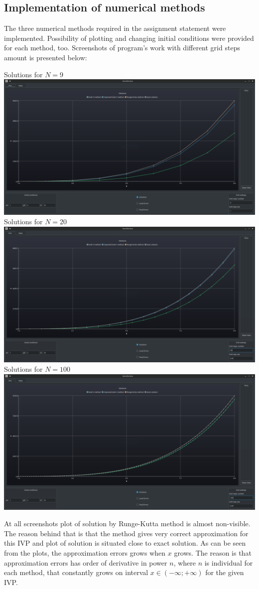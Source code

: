 \documentclass[a4paper,12pt]{article}
\begin{document}
\subsection{Implementation of numerical methods}
The three numerical methods required in the assignment statement were
implemented. Possibility of plotting and changing initial conditions were provided 
for each method, too. Screenshots of program's work with different grid steps
amount is presented below:
\newpage
\begin{center}
\large Solutions for $N=9$
\includegraphics[width=\linewidth]{shot1.png}
\large Solutions for $N=20$
\includegraphics[width=\linewidth]{shot3.png}
\newpage
\large Solutions for $N=100$
\includegraphics[width=\linewidth]{shot2.png}
\end{center}
At all screenshots plot of solution by Runge-Kutta method is almost non-visible. 
The reason behind that is that the method gives very correct approximation for this IVP and 
plot of solution is situated close to exact solution.
As can be seen from the plots, the approximation errors grows when $x$ grows.
The reason is that approximation errors has order of derivative in power $n$,
where $n$ is individual for each method, that constantly grows on interval
$x\in(-\infty;+\infty)$ for the given IVP.
\end{document}
